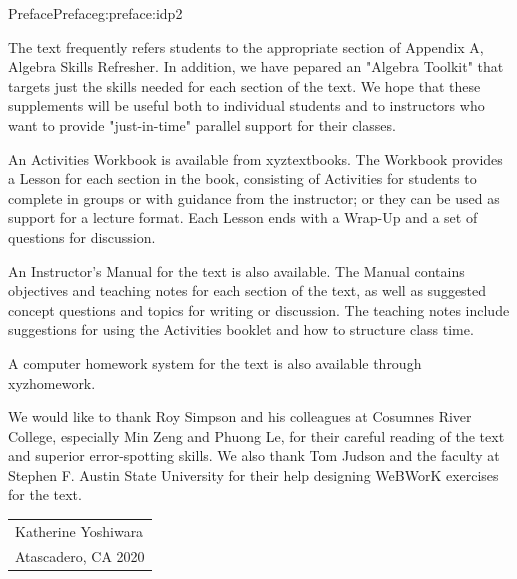 \documentclass[oneside,10pt,]{book}
\numberwithin{equation}{section}
\begin{document}
\begin{preface}{Preface}{}{Preface}{}{}{g:preface:idp2}
\par
The text frequently refers students to the appropriate section of Appendix A, Algebra Skills Refresher. In addition, we have pepared an "Algebra Toolkit" that targets just the skills needed for each section of the text. We hope that these supplements will be useful both to individual students and to instructors who want to provide "just-in-time" parallel support for their classes.%
\par
An Activities Workbook is available from xyztextbooks. The Workbook provides a Lesson for each section in the book, consisting of Activities for students to complete in groups or with guidance from the instructor; or they can be used as support for a lecture format. Each Lesson ends with a Wrap-Up and a set of questions for discussion.%
\par
An Instructor's Manual for the text is also available. The Manual contains objectives and teaching notes for each section of the text, as well as suggested concept questions and topics for writing or discussion. The teaching notes include suggestions for using the Activities booklet and how to structure class time.%
\par
A computer homework system for the text is also available through xyzhomework.%
\par
We would like to thank Roy Simpson and his colleagues at Cosumnes River College, especially Min Zeng and Phuong Le, for their careful reading of the text and superior error-spotting skills. We also thank Tom Judson and the faculty at Stephen F. Austin State University for their help designing WeBWorK exercises for the text.%
\nopagebreak\par%
\hfill\begin{tabular}[t]{l@{}}
\\
Katherine Yoshiwara\\
Atascadero, CA 2020
\end{tabular}\\\par
\end{preface}
\setcounter{tocdepth}{2}
\renewcommand*\contentsname{Contents}
\tableofcontents
\mainmatter
%
%
\typeout{************************************************}
\typeout{************************************************}
%
\end{document}
